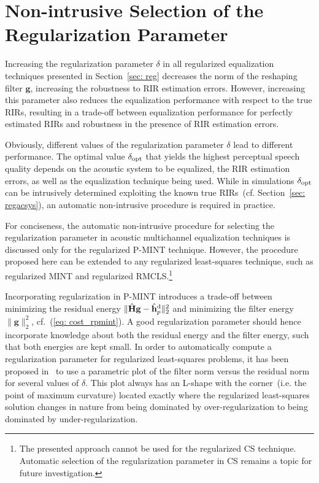 \documentclass[draftcls,onecolumn,11pt]{IEEEtran}
\begin{document}
\section{Non-intrusive Selection of the Regularization Parameter}
\label{sec: sel_reg}
Increasing the regularization parameter $\delta$ in all regularized equalization techniques presented in Section~\ref{sec: reg} decreases the norm of the reshaping filter $\mathbf{g}$, increasing the robustness to RIR estimation errors.
However, increasing this parameter also reduces the equalization performance with respect to the true RIRs, resulting in a trade-off between equalization performance for perfectly estimated RIRs and robustness in the presence of RIR estimation errors.

Obviously, different values of the regularization parameter $\delta$ lead to different performance.
The optimal value $\delta_{\rm opt}$ that yields the highest perceptual speech quality depends on the acoustic system to be equalized, the RIR estimation errors, as well as the equalization technique being used.
While in simulations $\delta_{\rm opt}$ can be intrusively determined exploiting the known true RIRs~(cf. Section~\ref{sec: regacsys}), an automatic non-intrusive procedure is required in practice.

For conciseness, the automatic non-intrusive procedure for selecting the regularization parameter in acoustic multichannel equalization techniques is discussed only for the regularized P-MINT technique.
However, the procedure proposed here can be extended to any regularized least-squares technique, such as regularized MINT and regularized RMCLS.\footnote{The presented approach cannot be used for the regularized CS technique. Automatic selection of the regularization parameter in CS remains a topic for future investigation.}

Incorporating regularization in P-MINT introduces a trade-off between minimizing the residual energy $\|\hat{\mathbf{H}}\mathbf{g} - \hat{\mathbf{h}}_p^{\rm d} \|_2^2$ and minimizing the filter energy $\|\mathbf{g}\|_2^2$, cf.~(\ref{eq: cost_rpmint}).
A good regularization parameter should hence incorporate knowledge about both the residual energy and the filter energy, such that both energies are kept small.
In order to automatically compute a regularization parameter for regularized least-squares problems, it has been proposed in~\cite{Hansen_1993} to use a parametric plot of the filter norm versus the residual norm for several values of $\delta$.
This plot always has an L-shape with the corner~(i.e. the point of maximum curvature) located exactly where the regularized least-squares solution changes in nature from being dominated by over-regularization to being dominated by under-regularization.
\end{document}
